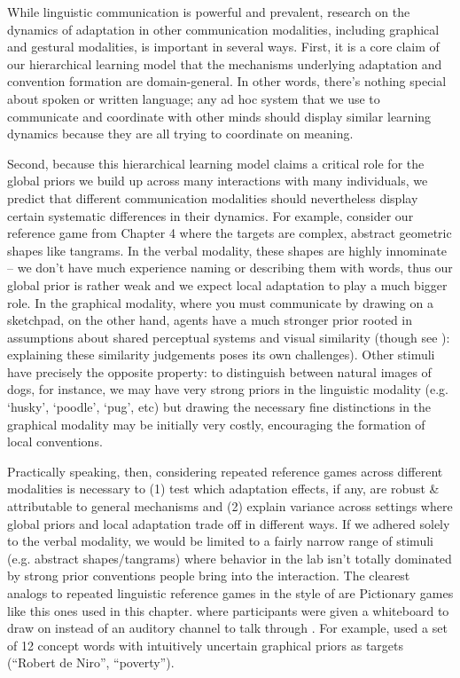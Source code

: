 While linguistic communication is powerful and prevalent, research on the dynamics of adaptation in other communication modalities, including graphical and gestural modalities, is important in several ways.
First, it is a core claim of our hierarchical learning model that the mechanisms underlying adaptation and convention formation are domain-general.
In other words, there's nothing special about spoken or written language; any ad hoc system that we use to communicate and coordinate with other minds should display similar learning dynamics because they are all trying to coordinate on meaning. 

Second, because this hierarchical learning model claims a critical role for the global priors we build up across many interactions with many individuals, we predict that different communication modalities should nevertheless display certain systematic differences in their dynamics.
For example, consider our reference game from Chapter 4 where the targets are complex, abstract geometric shapes like tangrams.
In the verbal modality, these shapes are highly innominate -- we don't have much experience naming or describing them with words, thus our global prior is rather weak and we expect local adaptation to play a much bigger role.
In the graphical modality, where you must communicate by drawing on a sketchpad, on the other hand, agents have a much stronger prior rooted in assumptions about shared perceptual systems and visual similarity (though see ): explaining these similarity judgements poses its own challenges).
Other stimuli have precisely the opposite property: to distinguish between natural images of dogs, for instance, we may have very strong priors in the linguistic modality (e.g. `husky', `poodle', `pug', etc) but drawing the necessary fine distinctions in the graphical modality may be initially very costly, encouraging the formation of local conventions. 

Practically speaking, then, considering repeated reference games across different modalities is necessary to (1) test which adaptation effects, if any, are robust \& attributable to general mechanisms and (2) explain variance across settings where global priors and local adaptation trade off in different ways.
If we adhered solely to the verbal modality, we would be limited to a fairly narrow range of stimuli (e.g. abstract shapes/tangrams) where behavior in the lab isn't totally dominated by strong prior conventions people bring into the interaction. 
The clearest analogs to repeated linguistic reference games in the style of \cite{KraussWeinheimer64_ReferencePhrases} are Pictionary games like this ones used in this chapter.
where participants were given a whiteboard to draw on instead of an auditory channel to talk through \cite{TheisenEtAl10_SystematicityArbitrariness}.
For example,  used a set of 12 concept words with intuitively uncertain graphical priors as targets (``Robert de Niro'', ``poverty'').


